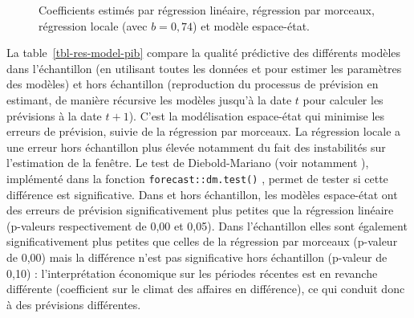 \documentclass[
  a4paper,
  DIV=11,
  numbers=noendperiod,
  french]{scrartcl}
\newcommand\1{{\mathds 1}}
\theoremstyle{remark}
\begin{document}
\begin{figure}

\caption{\label{fig-coef-ssm}Coefficients estimés par régression
linéaire, régression par morceaux, régression locale (avec \(b=0,74\))
et modèle espace-état.}


\end{figure}%

La table~\ref{tbl-res-model-pib} compare la qualité prédictive des
différents modèles dans l'échantillon (en utilisant toutes les données
et pour estimer les paramètres des modèles) et hors échantillon
(reproduction du processus de prévision en estimant, de manière
récursive les modèles jusqu'à la date \(t\) pour calculer les prévisions
à la date \(t+1\)). C'est la modélisation espace-état qui minimise les
erreurs de prévision, suivie de la régression par morceaux. La
régression locale a une erreur hors échantillon plus élevée notamment du
fait des instabilités sur l'estimation de la fenêtre. Le test de
Diebold-Mariano (voir notamment \textcite{DMtest}), implémenté dans la
fonction \texttt{forecast::dm.test()} \autocite{forecastR}, permet de
tester si cette différence est significative. Dans et hors échantillon,
les modèles espace-état ont des erreurs de prévision significativement
plus petites que la régression linéaire (p-valeurs respectivement de
0,00 et 0,05). Dans l'échantillon elles sont également significativement
plus petites que celles de la régression par morceaux (p-valeur de 0,00)
mais la différence n'est pas significative hors échantillon (p-valeur de
0,10) : l'interprétation économique sur les périodes récentes est en
revanche différente (coefficient sur le climat des affaires en
différence), ce qui conduit donc à des prévisions différentes.
\end{document}
